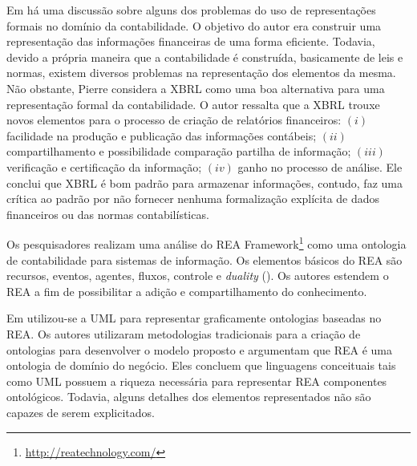 \documentclass[msc,proposal,hidelot,hideabstract]{ppgccufmg} %
\begin{document}
Em \cite{journals/ijcsa/Pierre08} há uma discussão sobre alguns dos problemas do uso de representações formais no domínio da contabilidade. O objetivo do autor era construir uma representação das informações financeiras de uma forma eficiente. Todavia, devido a própria maneira que a contabilidade é construída, basicamente de leis e normas, existem diversos problemas na representação dos elementos da mesma. Não obstante, Pierre considera a XBRL como uma boa alternativa para uma representação formal da contabilidade. O autor ressalta que a XBRL trouxe novos elementos para o processo de criação de relatórios financeiros: $(i)$ facilidade na produção e publicação das informações contábeis; $(ii)$ compartilhamento e possibilidade comparação partilha de informação; $(iii)$ verificação e certificação da informação; $(iv)$ ganho no processo de análise. Ele conclui que XBRL é bom padrão para armazenar informações, contudo, faz uma crítica ao padrão por não fornecer nenhuma formalização explícita de dados financeiros ou das normas contabilísticas.

Os pesquisadores \cite{lupacsc2010role} realizam uma análise do REA Framework\footnote{\url{http://reatechnology.com/}} como uma ontologia de contabilidade para sistemas de informação. Os elementos básicos do REA são recursos, eventos, agentes, fluxos, controle e \textit{duality} (\cite{mccarthy1982rea}). Os autores estendem o REA a fim de possibilitar a adição e compartilhamento do conhecimento.

Em \cite{gailly2007positioning} utilizou-se a UML para representar graficamente ontologias baseadas no REA. Os autores utilizaram metodologias tradicionais para a criação de ontologias para desenvolver o modelo proposto e argumentam que REA é uma ontologia de domínio do negócio. Eles concluem que linguagens conceituais tais como UML possuem a riqueza necessária para representar REA componentes ontológicos. Todavia, alguns detalhes dos elementos representados não são capazes de serem explicitados.
\end{document}
